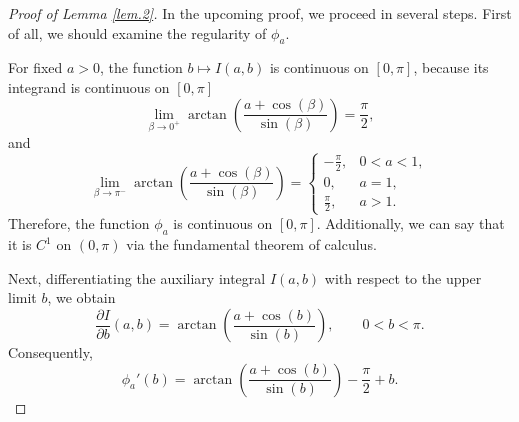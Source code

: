 \documentclass[preprint,12pt,nopreprintline]{elsarticle}
\begin{document}
\begin{proof}[Proof of Lemma \ref{lem.2}]\normalfont

In the upcoming proof, we proceed in several steps. First of all, we should examine the regularity of \(\phi_a\).

For fixed \(a>0\), the function \(b\mapsto I(a,b)\) is continuous on \([0,\pi]\), because
its integrand is continuous on \([0,\pi]\)
\begin{equation}
\lim_{\beta\to 0^+}\arctan\!\left(\frac{a+\cos\left(\beta\right)}{\sin\left(\beta\right)}\right)=\frac{\pi}{2},
\end{equation}
and
\begin{equation}
\lim_{\beta\to \pi^-}\arctan\!\left(\frac{a+\cos\left(\beta\right)}{\sin\left(\beta\right)}\right)
=
\begin{cases}
-\frac{\pi}{2}, & 0<a<1,\\[4pt]
0, & a=1,\\[4pt]
\frac{\pi}{2}, & a>1.
\end{cases}
\end{equation}
Therefore, the function \(\phi_a\) is continuous on \([0,\pi]\). Additionally, we can say that it is \(C^1\) on \((0,\pi)\) via the fundamental theorem of calculus.

Next, differentiating the auxiliary integral \(I(a,b)\) with respect to the upper limit \(b\), we obtain
\begin{equation}
\frac{\partial I}{\partial b}(a,b)
=
\arctan\!\left(\frac{a+\cos \left(b\right)}{\sin \left(b\right)}\right),
\qquad 0<b<\pi.
\end{equation}
Consequently,
\begin{equation}
\phi_a'(b)
= 
\arctan\!\left(\frac{a+\cos \left(b\right)}{\sin \left(b\right)}\right)-\frac{\pi}{2}+b.
\end{equation}


\end{proof}
\end{document}
